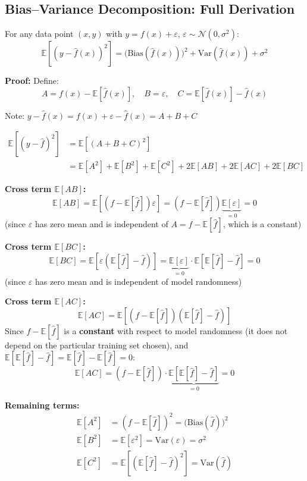\documentclass[12pt,a4paper]{article}
\newcommand{\E}{\mathbb{E}}
\newcommand{\Var}{\mathrm{Var}}
\newcommand{\Bias}{\mathrm{Bias}}
\begin{document}
\subsection{Bias--Variance Decomposition: Full Derivation}

\begin{thmbox}[title={Bias--Variance--Noise Decomposition}]
For any data point $(x, y)$ with $y = f(x) + \varepsilon$, $\varepsilon \sim \mathcal{N}(0, \sigma^2)$:
\[
\E\!\left[(y - \hat{f}(x))^2\right]
= \bigl(\Bias(\hat{f}(x))\bigr)^2 + \Var(\hat{f}(x)) + \sigma^2
\]
\end{thmbox}

\textbf{Proof:} Define:
\[
A = f(x) - \E[\hat{f}(x)],\quad
B = \varepsilon,\quad
C = \E[\hat{f}(x)] - \hat{f}(x)
\]

Note: $y - \hat{f}(x) = f(x) + \varepsilon - \hat{f}(x) = A + B + C$

\begin{align*}
\E[(y-\hat{f})^2]
&= \E\!\left[(A+B+C)^2\right]\\
&= \E[A^2] + \E[B^2] + \E[C^2]
  + 2\E[AB] + 2\E[AC] + 2\E[BC]
\end{align*}

\textbf{Cross term $\E[AB]$:}
\[
\E[AB] = \E[(f - \E[\hat{f}])\varepsilon]
= (f-\E[\hat{f}])\underbrace{\E[\varepsilon]}_{=0} = 0
\]
(since $\varepsilon$ has zero mean and is independent of $A = f - \E[\hat{f}]$, which is a constant)

\textbf{Cross term $\E[BC]$:}
\[
\E[BC] = \E[\varepsilon(\E[\hat{f}] - \hat{f})]
= \underbrace{\E[\varepsilon]}_{=0}\cdot\E[\E[\hat{f}]-\hat{f}] = 0
\]
(since $\varepsilon$ has zero mean and is independent of model randomness)

\textbf{Cross term $\E[AC]$:}
\[
\E[AC] = \E[(f-\E[\hat{f}])(\E[\hat{f}]-\hat{f})]
\]
Since $f - \E[\hat{f}]$ is a \textbf{constant} with respect to model randomness (it does not depend on the particular training set chosen), and $\E[\E[\hat{f}]-\hat{f}] = \E[\hat{f}] - \E[\hat{f}] = 0$:
\[
\E[AC] = (f - \E[\hat{f}])\cdot\underbrace{\E[\E[\hat{f}]-\hat{f}]}_{=0} = 0
\]

\textbf{Remaining terms:}
\begin{align*}
\E[A^2] &= (f - \E[\hat{f}])^2 = \bigl(\Bias(\hat{f})\bigr)^2\\
\E[B^2] &= \E[\varepsilon^2] = \Var(\varepsilon) = \sigma^2\\
\E[C^2] &= \E\!\left[(\E[\hat{f}] - \hat{f})^2\right] = \Var(\hat{f})
\end{align*}
\end{document}
